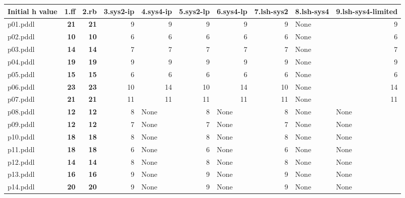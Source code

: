 \documentclass{article}
\begin{document}
\begin{tabular}{@{}lrrrrrrrrr@{}}
Initial h value & 1.ff & 2.rb & 3.sys2-ip & 4.sys4-ip & 5.sys2-lp & 6.sys4-lp & 7.lsh-sys2 & 8.lsh-sys4 & 9.lsh-sys4-limited \\
\midrule
p01.pddl & \textbf{21} & \textbf{21} & 9 & 9 & 9 & 9 & 9 & \multicolumn{1}{|l|}{None} & 9 \\
p02.pddl & \textbf{10} & \textbf{10} & 6 & 6 & 6 & 6 & 6 & \multicolumn{1}{|l|}{None} & 6 \\
p03.pddl & \textbf{14} & \textbf{14} & 7 & 7 & 7 & 7 & 7 & \multicolumn{1}{|l|}{None} & 7 \\
p04.pddl & \textbf{19} & \textbf{19} & 9 & 9 & 9 & 9 & 9 & \multicolumn{1}{|l|}{None} & 9 \\
p05.pddl & \textbf{15} & \textbf{15} & 6 & 6 & 6 & 6 & 6 & \multicolumn{1}{|l|}{None} & 6 \\
p06.pddl & \textbf{23} & \textbf{23} & 10 & 14 & 10 & 14 & 10 & \multicolumn{1}{|l|}{None} & 14 \\
p07.pddl & \textbf{21} & \textbf{21} & 11 & 11 & 11 & 11 & 11 & \multicolumn{1}{|l|}{None} & 11 \\
p08.pddl & \textbf{12} & \textbf{12} & 8 & \multicolumn{1}{|l|}{None} & 8 & \multicolumn{1}{|l|}{None} & 8 & \multicolumn{1}{|l|}{None} & \multicolumn{1}{|l|}{None} \\
p09.pddl & \textbf{12} & \textbf{12} & 7 & \multicolumn{1}{|l|}{None} & 7 & \multicolumn{1}{|l|}{None} & 7 & \multicolumn{1}{|l|}{None} & \multicolumn{1}{|l|}{None} \\
p10.pddl & \textbf{18} & \textbf{18} & 8 & \multicolumn{1}{|l|}{None} & 8 & \multicolumn{1}{|l|}{None} & 8 & \multicolumn{1}{|l|}{None} & \multicolumn{1}{|l|}{None} \\
p11.pddl & \textbf{18} & \textbf{18} & 6 & \multicolumn{1}{|l|}{None} & 6 & \multicolumn{1}{|l|}{None} & 6 & \multicolumn{1}{|l|}{None} & \multicolumn{1}{|l|}{None} \\
p12.pddl & \textbf{14} & \textbf{14} & 8 & \multicolumn{1}{|l|}{None} & 8 & \multicolumn{1}{|l|}{None} & 8 & \multicolumn{1}{|l|}{None} & \multicolumn{1}{|l|}{None} \\
p13.pddl & \textbf{16} & \textbf{16} & 9 & \multicolumn{1}{|l|}{None} & 9 & \multicolumn{1}{|l|}{None} & 9 & \multicolumn{1}{|l|}{None} & \multicolumn{1}{|l|}{None} \\
p14.pddl & \textbf{20} & \textbf{20} & 9 & \multicolumn{1}{|l|}{None} & 9 & \multicolumn{1}{|l|}{None} & 9 & \multicolumn{1}{|l|}{None} & \multicolumn{1}{|l|}{None} \\

\end{tabular}
\end{document}
